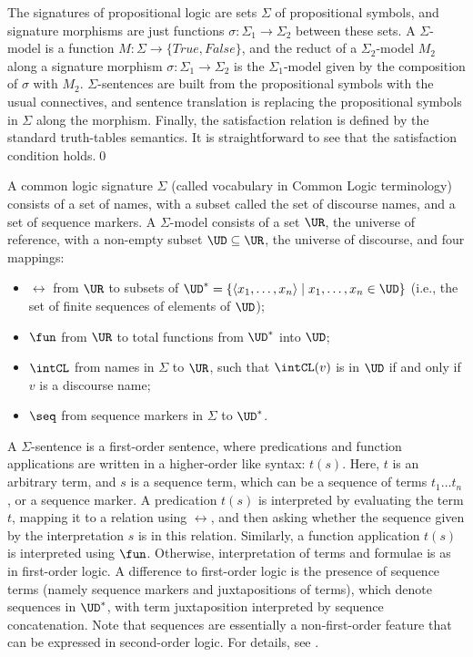 \documentclass[10pt,fleqn,final]{scrreprt}
\newenvironment{definitions}[0]{\medskip }{}
\providecommand{\DIFaddbegin}{} %
\providecommand{\DIFaddend}{} %
\begin{document}
\begin{definitions}
\begin{definition}\label{Prop}
The signatures of propositional logic are sets $\Sigma$ of propositional symbols, and signature morphisms are just
functions $\sigma:{\Sigma_1}\to{\Sigma_2}$ between these sets. 
A $\Sigma$-model is a function $M : {\Sigma}\to{\{True, False\}}$, and the reduct of a 
$\Sigma_2$-model $M_2$ along a signature morphism $\sigma:{\Sigma_1}\to{\Sigma_2}$ is 
the $\Sigma_1$-model given by the composition of $\sigma$ with $M_2$. $\Sigma$-sentences are built from the
propositional symbols with the usual connectives, and sentence translation is replacing the propositional
symbols in $\Sigma$ along the morphism. Finally, the satisfaction relation is defined by the standard truth-tables
semantics. It is straightforward to see that the satisfaction condition holds.\DIFaddbegin \quad\DIFaddend \qed
\end{definition}

\begin{definition}\label{sem:CommonLogic}
A common logic signature
$\Sigma$ (called vocabulary in Common Logic terminology) consists of a
set of names, with a subset called the set of discourse names, and a
set of sequence markers.
A $\Sigma$-model consists of a set $\UR$,
the universe of reference, with a non-empty subset $\UD\subseteq \UR$,
the universe of discourse, and four mappings:
  \begin{itemize}
   \item $\rel$ from $\UR$ to subsets of $\UD^* = \{\langle x_1,\ldots,x_n \rangle \mid x_1,\ldots,x_n \in \UD\}$ (i.e., the set of finite sequences of
elements of $\UD$);
   \item $\fun$ from $\UR$ to total functions from $\UD^*$ into $\UD$;
   \item $\intCL$ from names in $\Sigma$ to $\UR$, such that
$\intCL(v)$ is in $\UD$ if and only if $v$ is a discourse name;
   \item $\seq$ from sequence markers in $\Sigma$ to $\UD^*$.
  \end{itemize}  A $\Sigma$-sentence is a first-order
sentence, where predications and function applications are written
in a higher-order like syntax: $t(s)$.
Here, $t$ is an arbitrary term, and $s$ is a sequence term, which can
be a sequence of terms $t_1\ldots t_n$, or a sequence marker.
A predication $t(s)$ is interpreted by evaluating the term $t$,
mapping it to a relation using $\rel$, and then asking whether the sequence
given by the interpretation $s$ is in this relation.  
Similarly, a function application $t(s)$ is interpreted using $\fun$.
Otherwise, interpretation of terms and formulae is as in
first-order logic. 
A 
difference to first-order logic is the presence of sequence terms (namely sequence markers and
juxtapositions of terms), which denote sequences in $\UD^*$, with term
juxtaposition interpreted by sequence concatenation.
Note that sequences are essentially a non-first-order feature that
can be expressed in second-order logic.
For details, see \cite{CommonLogic:oldfashioned}.


\end{definition}
\end{definitions}
\end{document}
